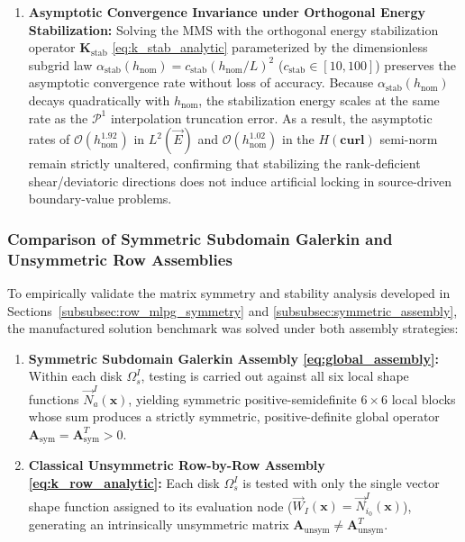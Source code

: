 \documentclass[VANCOUVER,Times1COL]{WileyNJD-v5}
\begin{document}
\begin{enumerate}
    \item \textbf{Asymptotic Convergence Invariance under Orthogonal Energy Stabilization:} Solving the MMS with the orthogonal energy stabilization operator $\mathbf{K}_{\mathrm{stab}}$ \eqref{eq:k_stab_analytic} parameterized by the dimensionless subgrid law $\alpha_{\mathrm{stab}}(h_{\mathrm{nom}}) = c_{\mathrm{stab}} (h_{\mathrm{nom}}/L)^2$ ($c_{\mathrm{stab}} \in [10, 100]$) preserves the asymptotic convergence rate without loss of accuracy. Because $\alpha_{\mathrm{stab}}(h_{\mathrm{nom}})$ decays quadratically with $h_{\mathrm{nom}}$, the stabilization energy scales at the same rate as the $\mathcal{P}^1$ interpolation truncation error. As a result, the asymptotic rates of $\mathcal{O}(h_{\mathrm{nom}}^{1.92})$ in $L^2(\vec{E})$ and $\mathcal{O}(h_{\mathrm{nom}}^{1.02})$ in the $H(\mathbf{curl})$ semi-norm remain strictly unaltered, confirming that stabilizing the rank-deficient shear/deviatoric directions does not induce artificial locking in source-driven boundary-value problems.
\end{enumerate}

\subsubsection{Comparison of Symmetric Subdomain Galerkin and Unsymmetric Row Assemblies}
\label{subsubsec:mms_assembly_comparison}

To empirically validate the matrix symmetry and stability analysis developed in Sections~\ref{subsubsec:row_mlpg_symmetry} and \ref{subsubsec:symmetric_assembly}, the manufactured solution benchmark was solved under both assembly strategies:
\begin{enumerate}
    \item \textbf{Symmetric Subdomain Galerkin Assembly \eqref{eq:global_assembly}:} Within each disk $\Omega_s^I$, testing is carried out against all six local shape functions $\vec{N}_a^I(\mathbf{x})$, yielding symmetric positive-semidefinite $6 \times 6$ local blocks whose sum produces a strictly symmetric, positive-definite global operator $\mathbf{A}_{\mathrm{sym}} = \mathbf{A}_{\mathrm{sym}}^T > 0$.
    \item \textbf{Classical Unsymmetric Row-by-Row Assembly \eqref{eq:k_row_analytic}:} Each disk $\Omega_s^I$ is tested with only the single vector shape function assigned to its evaluation node ($\vec{W}_I(\mathbf{x}) = \vec{N}_{i_0}^I(\mathbf{x})$), generating an intrinsically unsymmetric matrix $\mathbf{A}_{\mathrm{unsym}} \ne \mathbf{A}_{\mathrm{unsym}}^T$.
\end{enumerate}
\end{document}
